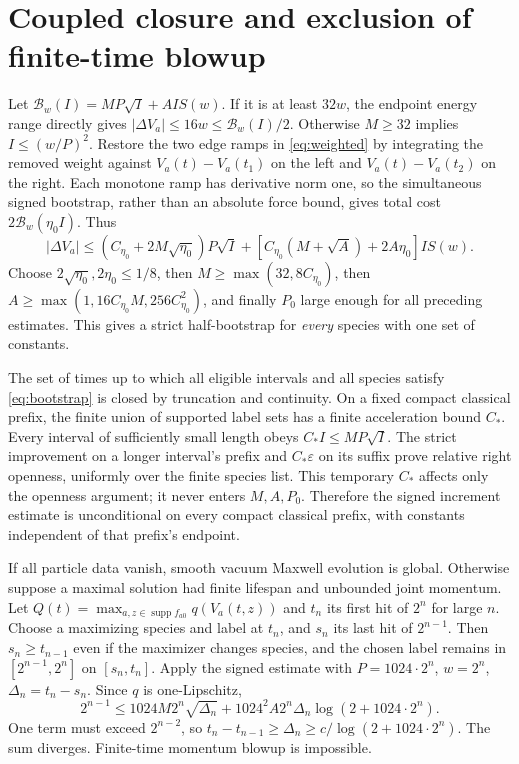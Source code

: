 \documentclass[11pt]{article}
\newcommand{\supp}{\operatorname{supp}}
\theoremstyle{remark}\newtheorem{remark}[theorem]{Remark}
\numberwithin{equation}{section}
\begin{document}
\section{Coupled closure and exclusion of finite-time blowup}
Let $\mathcal B_w(I)=MP\sqrt I+AI S(w)$.
If it is at least $32w$, the endpoint energy range directly gives
$|\Delta V_a|\le16w\le\mathcal B_w(I)/2$.
Otherwise $M\ge32$ implies $I\le(w/P)^2$.
Restore the two edge ramps in \eqref{eq:weighted} by integrating the
removed weight against $V_a(t)-V_a(t_1)$ on the left and
$V_a(t)-V_a(t_2)$ on the right. Each monotone ramp has derivative norm one,
so the simultaneous signed bootstrap, rather than an absolute force bound,
gives total cost $2\mathcal B_w(\eta_0I)$. Thus
\[
 |\Delta V_a|\le(C_{\eta_0}+2M\sqrt{\eta_0})P\sqrt I+
  [C_{\eta_0}(M+\sqrt A)+2A\eta_0]IS(w).
\]
Choose $2\sqrt{\eta_0},2\eta_0\le1/8$, then
$M\ge\max(32,8C_{\eta_0})$, then
$A\ge\max(1,16C_{\eta_0}M,256C_{\eta_0}^2)$, and finally $P_0$
large enough for all preceding estimates. This gives a strict half-bootstrap
for \emph{every} species with one set of constants.

The set of times up to which all eligible intervals and all species satisfy
\eqref{eq:bootstrap} is closed by truncation and continuity. On a fixed
compact classical prefix, the finite union of supported label sets has a
finite acceleration bound $C_*$. Every interval of sufficiently small length
obeys $C_*I\le MP\sqrt I$. The strict improvement on a longer interval's
prefix and $C_*\varepsilon$ on its suffix prove relative right openness,
uniformly over the finite species list. This temporary $C_*$ affects only
the openness argument; it never enters $M,A,P_0$.
Therefore the signed increment estimate is unconditional on every compact
classical prefix, with constants independent of that prefix's endpoint.

If all particle data vanish, smooth vacuum Maxwell evolution is global.
Otherwise suppose a maximal solution had finite lifespan and unbounded joint momentum.
Let $Q(t)=\max_{a,z\in\supp f_{a0}}q(V_a(t,z))$ and $t_n$ its first hit
of $2^n$ for large $n$. Choose a maximizing species and label at $t_n$,
and $s_n$ its last hit of $2^{n-1}$. Then $s_n\ge t_{n-1}$ even if the
maximizer changes species, and the chosen label remains in
$[2^{n-1},2^n]$ on $[s_n,t_n]$. Apply the signed estimate with
$P=1024\cdot2^n$, $w=2^n$, $\Delta_n=t_n-s_n$. Since $q$ is
one-Lipschitz,
\[
 2^{n-1}\le1024M2^n\sqrt{\Delta_n}+
       1024^2A2^n\Delta_n\log(2+1024\cdot2^n).
\]
One term must exceed $2^{n-2}$, so
$t_n-t_{n-1}\ge\Delta_n\ge c/\log(2+1024\cdot2^n)$.
The sum diverges. Finite-time momentum blowup is impossible.
\end{document}
